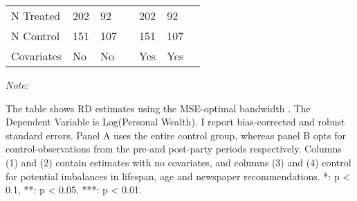 \begin{table}[!h]
\begin{threeparttable}
\begin{tabular}[t]{lllrllr}
\hspace{1em}N Treated & 202 & 92 &  & 202 & 92 & \\
\hspace{1em}N Control & 151 & 107 &  & 151 & 107 & \\
\hspace{1em}Covariates & No & No &  & Yes & Yes & \\
\bottomrule
\end{tabular}
\begin{tablenotes}[para]
\item \textit{Note: } 
\item The table shows RD estimates using the MSE-optimal bandwidth \citep{cattaneo2019practical}. The Dependent Variable is Log(Personal Wealth). I report bias-corrected and robust standard errors. Panel A uses the entire control group, whereas panel B opts for control-observations from the pre-and post-party periods respectively. Columns (1) and (2) contain estimates with no covariates, and columns (3) and (4) control for potential imbalances in lifespan, age and newspaper recommendations. *: p < 0.1, **: p < 0.05, ***: p < 0.01.
\end{tablenotes}
\end{threeparttable}
\end{table}
